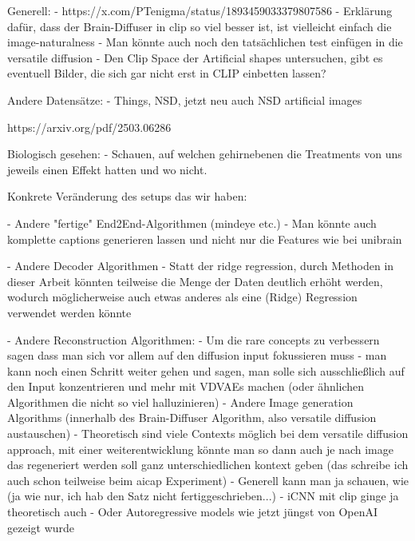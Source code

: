 

Generell:
- https://x.com/PTenigma/status/1893459033379807586
- Erklärung dafür, dass der Brain-Diffuser in clip so viel besser ist, ist vielleicht einfach die image-naturalness
- Man könnte auch noch den tatsächlichen test einfügen in die versatile diffusion
- Den Clip Space der Artificial shapes untersuchen, gibt es eventuell Bilder, die sich gar nicht erst in CLIP einbetten lassen?

Andere Datensätze:
- Things, NSD, jetzt neu auch NSD artificial images 

https://arxiv.org/pdf/2503.06286

Biologisch gesehen:
- Schauen, auf welchen gehirnebenen die Treatments von uns jeweils einen Effekt hatten und wo nicht.

Konkrete Veränderung des setups das wir haben:

- Andere "fertige" End2End-Algorithmen (mindeye etc.)
    - Man könnte auch komplette captions generieren lassen und nicht nur die Features wie bei unibrain \cite{maiUniBrainUnifyImage2023}

- Andere Decoder Algorithmen 
    - Statt der ridge regression, durch Methoden in dieser Arbeit könnten teilweise die Menge der Daten deutlich erhöht werden, wodurch möglicherweise auch etwas anderes als eine (Ridge) Regression verwendet werden könnte

- Andere Reconstruction Algorithmen:
    - Um die rare concepts zu verbessern sagen \cite{samuelGeneratingImagesRare2024} dass man sich vor allem auf den diffusion input fokussieren muss
        - man kann noch einen Schritt weiter gehen und sagen, man solle sich ausschließlich auf den Input konzentrieren und mehr mit VDVAEs machen (oder ähnlichen Algorithmen die nicht so viel halluzinieren)
    - Andere Image generation Algorithms (innerhalb des Brain-Diffuser Algorithm, also versatile diffusion austauschen)
    - Theoretisch sind viele Contexts möglich bei dem versatile diffusion approach, mit einer weiterentwicklung könnte man so dann auch je nach image das regeneriert werden soll ganz unterschiedlichen kontext geben (das schreibe ich auch schon teilweise beim aicap Experiment)
    - Generell kann man ja schauen, wie (ja wie nur, ich hab den Satz nicht fertiggeschrieben...)
    - iCNN mit clip ginge ja theoretisch auch
    - Oder Autoregressive models wie jetzt jüngst von OpenAI gezeigt wurde


